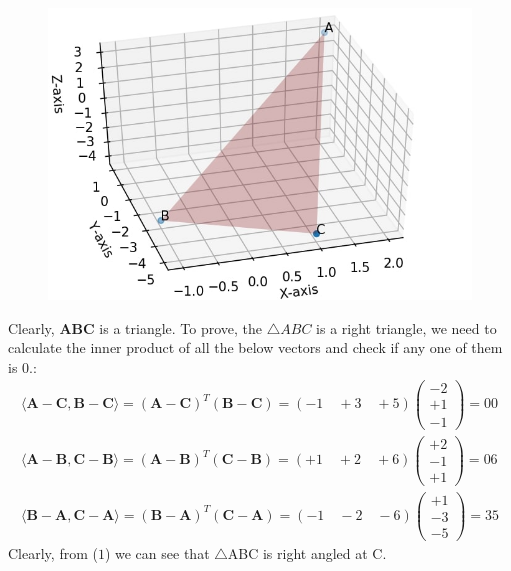 \documentclass{article}
\newcommand{\vect}[1]{\boldsymbol{\mathbf{#1}}}
\newcommand{\myvec}[1]{\ensuremath{\begin{pmatrix}#1\end{pmatrix}}}
\newcommand{\inner}[2]{\langle #1, #2 \rangle}
\begin{document}
\begin{figure}[!htb]
	
	\centering
	
	\includegraphics[width=\columnwidth]{assignment1fig-1.jpg}
	
	\caption{\label{fig1}}
	
	\label{fig:}
	
\end{figure}
Clearly, $\vect{A}\vect{B}\vect{C}$ is a triangle.
To prove, the $\triangle ABC$ is a right triangle, we need to calculate the inner product of all the below vectors and check if any one of them is 0.:
\begin{align}
	\inner{\vect{A}-\vect{C}}{\vect{B}-\vect{C}} = (\vect{A} -\vect{C})^T (\vect{B}-\vect{C}) = (-1 \quad+3 \quad +5) \myvec{-2 \\ +1 \\ -1}  = 00 \\
	\inner{\vect{A}-\vect{B}}{\vect{C}-\vect{B}} = (\vect{A} -\vect{B})^T (\vect{C}-\vect{B})
	 = (+1 \quad +2 \quad +6) \myvec{+2 \\ -1 \\ +1} = 06 \\
    \inner{\vect{B}-\vect{A}}{\vect{C}-\vect{A}} = (\vect{B} -\vect{A})^T (\vect{C}-\vect{A}) = (-1\quad-2 \quad-6) \myvec{+1\\-3\\-5} = 35 
\end{align}
Clearly, from ($1$) we can see that $\triangle$ABC is right angled at C.
\end{document}
